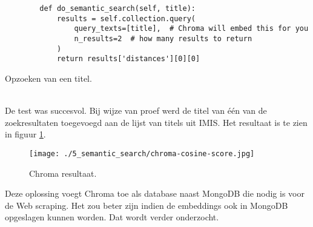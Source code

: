 \begin{listing}
    \begin{verbatim}
        def do_semantic_search(self, title):
            results = self.collection.query(
                query_texts=[title],  # Chroma will embed this for you
                n_results=2  # how many results to return
            )
            return results['distances'][0][0]
    \end{verbatim}
    \caption[Query Chroma]{Opzoeken van een titel.}
    \label{code:Chromaquery}
\end{listing}
\\
De test was succesvol. Bij wijze van proef werd de titel van één van de zoekresultaten toegevoegd aan de lijst van titels uit IMIS. Het resultaat is te zien in figuur \ref{fig:Chroma}.
\begin{figure}
    \centering
    \texttt{[image: ./5\_semantic\_search/chroma-cosine-score.jpg]}
    \caption[Chroma resultaat.]{\label{fig:Chroma}Chroma resultaat.}
\end{figure}
Deze oplossing voegt Chroma toe als database naast MongoDB die nodig is voor de Web scraping. Het zou beter zijn indien de embeddings ook in MongoDB opgeslagen kunnen worden. Dat wordt verder onderzocht.
